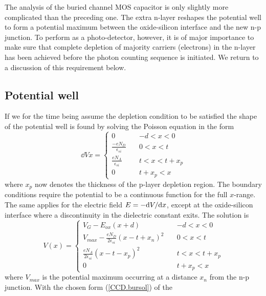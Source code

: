 The analysis of the buried channel MOS capacitor is only slightly more
complicated than the preceding one. The extra n-layer reshapes the
potential well to form a potential maximum between the oxide-silicon
interface and the new n-p junction. To perform as a photo-detector,
however, it is of major importance to make sure that complete
depletion of majority carriers (electrons) in the n-layer has been
achieved before the photon counting sequence is initiated. We return
to a discussion of this requirement below.

\subsection{Potential well}

If we for the time being assume the depletion condition to be
satisfied the shape of the potential well is found by solving the
Poisson equation in the form
\begin{equation}
  \dd{V}{x} = \left\{ \begin{array}{ll} 
	0 & -d < x < 0 \\
	\frac{\displaystyle -eN_D}{\displaystyle \epsilon_{si}} \quad &
	0 < x < t \\
	\frac{\displaystyle eN_A}{\displaystyle\epsilon_{si}} & 
	t < x < t+x_p \\
	0 & t+x_p < x
  \end{array} \right.
  \label{CCD.Poissonbur}
\end{equation}
where $x_p$ now denotes the thickness of the p-layer depletion
region. The boundary conditions require the potential to be a
continuous function for the full $x$-range. The same applies for the
electric field $E = -\mbox{d} V/\mbox{d} x$, except at the oxide-silicon
interface where a discontinuity in the dielectric constant exits.
The solution is
\begin{equation}
  V(x) = \left\{ \begin{array}{ll} 
	V_G-E_{ox}(x+d) & -d < x < 0 \\
	V_{max} - \frac{\displaystyle
	eN_D}{\displaystyle 2\epsilon_{si}} (x-t+x_n)^2 \quad & 
	0 < x < t \\ 
	\frac{\displaystyle eN_A}{\displaystyle
	2\epsilon_{si}}(x-t-x_p)^2 & t < x < t+x_p \\
	0 & t+x_p < x 
	\end{array} \right.
  \label{CCD.bursol}
\end{equation}
where $V_{max}$ is the potential maximum occurring at a distance $x_n$
from the n-p junction. With the chosen form (\ref{CCD.bursol}) of the

